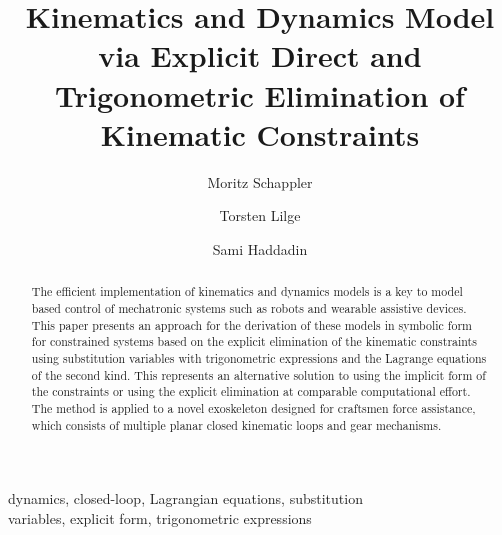 \documentclass{svproc}
\begin{document}
\mainmatter
%
\title{Kinematics and Dynamics Model via Explicit Direct and Trigonometric Elimination of Kinematic Constraints}
%
%
\author{Moritz Schappler \and Torsten Lilge \and Sami Haddadin}
%
%
%
\maketitle              %


\begin{abstract}

The efficient implementation of kinematics and dynamics models is a key to model based control of mechatronic systems such as robots and wearable assistive devices.
This paper presents an approach for the derivation of these models in symbolic form for constrained systems based on the explicit elimination of the kinematic constraints using substitution variables with trigonometric expressions and the Lagrange equations of the second kind.
This represents an alternative solution to using the implicit form of the constraints or using the explicit elimination at comparable computational effort.
%
The method is applied to a novel exoskeleton designed for craftsmen force assistance, which consists of multiple planar closed kinematic loops and gear mechanisms.
\end{abstract}


\begin{keywords}
dynamics, closed-loop, Lagrangian equations, substitution \\ variables, explicit form, trigonometric expressions
\end{keywords}
\end{document}
